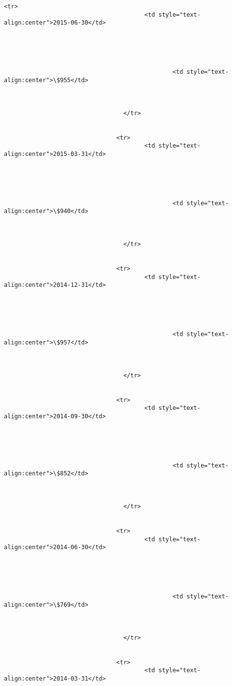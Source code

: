 \documentclass[11pt]{article}
\begin{document}
\begin{Verbatim}[commandchars=\\\{\}]
                                <tr>
                                        <td style="text-
align:center">2015-06-30</td>





                                                <td style="text-
align:center">\$955</td>



                                  </tr>


                                <tr>
                                        <td style="text-
align:center">2015-03-31</td>





                                                <td style="text-
align:center">\$940</td>



                                  </tr>


                                <tr>
                                        <td style="text-
align:center">2014-12-31</td>





                                                <td style="text-
align:center">\$957</td>



                                  </tr>


                                <tr>
                                        <td style="text-
align:center">2014-09-30</td>





                                                <td style="text-
align:center">\$852</td>



                                  </tr>


                                <tr>
                                        <td style="text-
align:center">2014-06-30</td>





                                                <td style="text-
align:center">\$769</td>



                                  </tr>


                                <tr>
                                        <td style="text-
align:center">2014-03-31</td>






\end{Verbatim}
\end{document}
